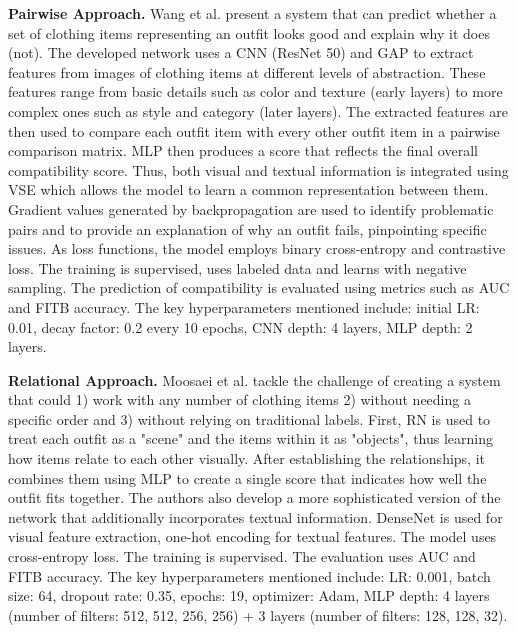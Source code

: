\textbf{Pairwise Approach.}
Wang et al. present a system that can predict whether a set of clothing items representing an outfit looks good and explain why it does (not). The developed network uses a \acs{CNN} (\acs{ResNet} 50) and \acs{GAP} to extract features from images of clothing items at different levels of abstraction. These features range from basic details such as color and texture (early layers) to more complex ones such as style and category (later layers). The extracted features are then used to compare each outfit item with every other outfit item in a pairwise comparison matrix. \acs{MLP} then produces a score that reflects the final overall compatibility score. Thus, both visual and textual information is integrated using \acs{VSE} which allows the model to learn a common representation between them. Gradient values generated by backpropagation are used to identify problematic pairs and to provide an explanation of why an outfit fails, pinpointing specific issues. As loss functions, the model employs binary cross-entropy and contrastive loss. The training is supervised, uses labeled data and learns with negative sampling. The prediction of compatibility is evaluated using metrics such as \acs{AUC} and \acs{FITB} accuracy. The key hyperparameters mentioned include: initial \acs{LR}: 0.01, decay factor: 0.2 every 10 epochs, \acs{CNN} depth: 4 layers, \acs{MLP} depth: 2 layers. \cite[vgl.]{wang_outfit_2019}

\vspace{5mm}

\textbf{Relational Approach.}
Moosaei et al. tackle the challenge of creating a system that could 1) work with any number of clothing items 2) without needing a specific order and 3) without relying on traditional labels. First, \acs{RN} is used to treat each outfit as a "scene" and the items within it as "objects", thus learning how items relate to each other visually. After establishing the relationships, it combines them using \acs{MLP} to create a single score that indicates how well the outfit fits together. The authors also develop a more sophisticated version of the network that additionally incorporates textual information. DenseNet is used for visual feature extraction, one-hot encoding for textual features. The model uses cross-entropy loss. The training is supervised. The evaluation uses \acs{AUC} and \acs{FITB} accuracy. The key hyperparameters mentioned include: \acs{LR}: 0.001, batch size: 64, dropout rate: 0.35, epochs: 19, optimizer: Adam, \acs{MLP} depth: 4 layers (number of filters: 512, 512, 256, 256) + 3 layers (number of filters: 128, 128, 32). \cite[vgl.]{moosaei_fashion_2020}


